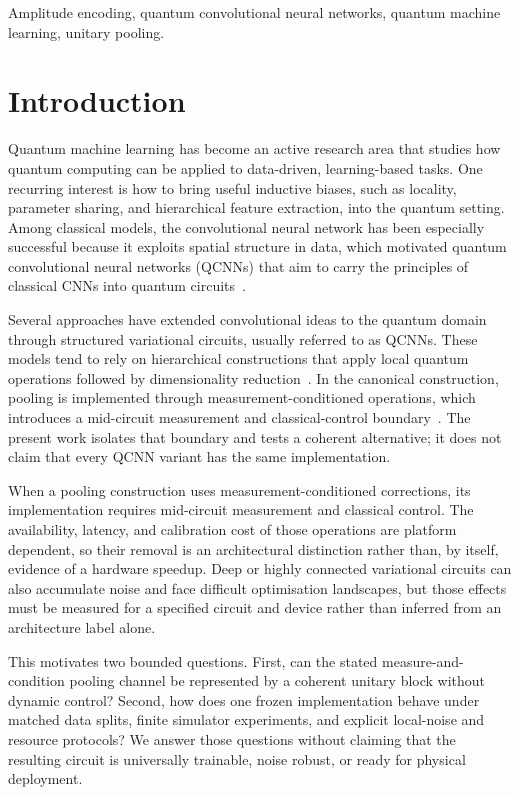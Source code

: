 \documentclass[conference]{IEEEtran}
\begin{document}
\begin{IEEEkeywords}
Amplitude encoding, quantum convolutional neural networks, quantum machine
learning, unitary pooling.
\end{IEEEkeywords}

\section{Introduction}
Quantum machine learning has become an active research area that studies how quantum computing can be applied to data-driven, learning-based tasks. One recurring interest is how to bring useful inductive biases, such as locality, parameter sharing, and hierarchical feature extraction, into the quantum setting. Among classical models, the convolutional neural network has been especially successful because it exploits spatial structure in data, which motivated quantum convolutional neural networks (QCNNs) that aim to carry the principles of classical CNNs into quantum circuits~\cite{ref37}.

Several approaches have extended convolutional ideas to the quantum domain through structured variational circuits, usually referred to as QCNNs. These models tend to rely on hierarchical constructions that apply local quantum operations followed by dimensionality reduction~\cite{ref37,ref46}. In the canonical construction, pooling is implemented through measurement-conditioned operations, which introduces a mid-circuit measurement and classical-control boundary~\cite{ref37}. The present work isolates that boundary and tests a coherent alternative; it does not claim that every QCNN variant has the same implementation.

When a pooling construction uses measurement-conditioned corrections, its implementation requires mid-circuit measurement and classical control. The availability, latency, and calibration cost of those operations are platform dependent, so their removal is an architectural distinction rather than, by itself, evidence of a hardware speedup. Deep or highly connected variational circuits can also accumulate noise and face difficult optimisation landscapes, but those effects must be measured for a specified circuit and device rather than inferred from an architecture label alone.

This motivates two bounded questions. First, can the stated measure-and-condition pooling channel be represented by a coherent unitary block without dynamic control? Second, how does one frozen implementation behave under matched data splits, finite simulator experiments, and explicit local-noise and resource protocols? We answer those questions without claiming that the resulting circuit is universally trainable, noise robust, or ready for physical deployment.
\end{document}
